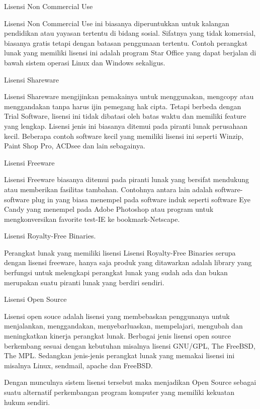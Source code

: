 \documentclass[../wastek.tex]{subfiles}
\begin{document}
\tabitem Lisensi Non Commercial Use

Lisensi Non Commercial Use ini biasanya diperuntukkan untuk kalangan pendidikan atau yayasan tertentu di bidang sosial. Sifatnya yang tidak komersial, biasanya gratis tetapi dengan batasan penggunaan tertentu. Contoh perangkat lunak yang memiliki lisensi ini adalah program Star Office yang dapat berjalan di bawah sistem operasi Linux dan Windows sekaligus.

\tabitem Lisensi Shareware

Lisensi Shareware mengijinkan pemakainya untuk menggunakan, mengcopy atau menggandakan tanpa harus ijin pemegang hak cipta. Tetapi berbeda dengan Trial Software, lisensi ini tidak dibatasi oleh batas waktu dan memiliki feature yang lengkap. Lisensi jenis ini biasanya ditemui pada piranti lunak perusahaan kecil. Beberapa contoh software kecil yang memiliki lisensi ini seperti Winzip, Paint Shop Pro, ACDsee dan lain sebagainya.

\tabitem Lisensi Freeware

Lisensi  Freeware  biasanya  ditemui  pada  piranti  lunak yang bersifat mendukung atau memberikan fasilitas tambahan. Contohnya antara lain adalah software-software plug in yang biasa menempel pada software induk seperti software Eye Candy yang menempel pada Adobe Photoshop atau program untuk mengkonversikan favorite test-IE ke bookmark-Netscape.

\tabitem Lisensi Royalty-Free Binaries.

Perangkat lunak yang memiliki lisensi Lisensi Royalty-Free Binaries serupa dengan lisensi freeware, hanya saja produk yang ditawarkan adalah library yang berfungsi untuk melengkapi perangkat lunak yang sudah ada dan bukan merupakan suatu piranti lunak yang berdiri sendiri.

\tabitem Lisensi Open Source

Lisensi open souce adalah lisensi yang membebaskan penggunanya untuk menjalankan, menggandakan, menyebarluaskan, mempelajari, mengubah dan meningkatkan kinerja perangkat lunak. Berbagai jenis lisensi open source berkembang sesuai dengan kebutuhan misalnya lisensi GNU/GPL, The FreeBSD, The MPL. Sedangkan jenis-jenis perangkat lunak yang memakai lisensi ini misalnya Linux, sendmail, apache dan FreeBSD.

Dengan munculnya sistem lisensi tersebut maka menjadikan Open Source sebagai suatu alternatif perkembangan program komputer yang memiliki kekuatan hukum sendiri.






\end{document}
